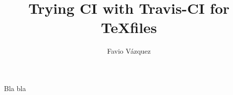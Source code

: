 \documentclass[a4paper,10pt]{article}
\title{Trying CI with Travis-CI for \TeX \space files}
\author{Favio Vázquez}
\begin{document}
\maketitle

Bla bla
\end{document}
